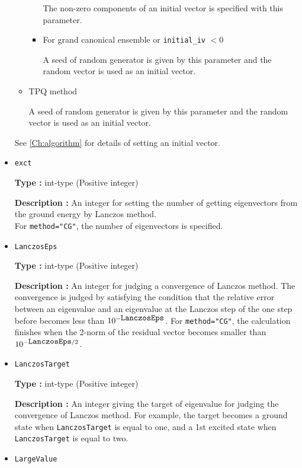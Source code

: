\begin{itemize}
\begin{itemize}
\begin{itemize}
The non-zero components of an initial vector is specified with this parameter. 

\item{For grand canonical ensemble or \verb|initial_iv| $< 0$}

A seed of random generator is given by this parameter and the random vector is used as an initial vector.
\end{itemize}

\item{TPQ method}

A seed of random generator is given by this parameter and the random vector is used as an initial vector.
\end{itemize}
See \ref{Ch:algorithm} for details of setting an initial vector.

 \item  \verb|exct|

{\bf Type :} int-type (Positive integer)

{\bf Description :} 
 An integer for setting the number of getting eigenvectors from the ground energy by Lanczos method.\\
For \verb|method="CG"|, the number of eigenvectors is specified.

\item   \verb|LanczosEps|
   
{\bf Type :} int-type (Positive integer)

{\bf Description :} An integer for judging a convergence of Lanczos method. The convergence is judged by satisfying the condition that the relative error between an eigenvalue and an eigenvalue at the Lanczos step of the one step before becomes less than $10^{- \verb|LanczosEps|}$.
For \verb|method="CG"|, the calculation finishes when the 2-norm of the residual vector
becomes smaller than $10^{- \verb|LanczosEps|/2}$.

 \item  \verb|LanczosTarget| 
   
 {\bf Type :} int-type (Positive integer)

  {\bf Description :} An integer giving the target of eigenvalue for judging the convergence of Lanczos method. For example, the target becomes a ground state when \verb|LanczosTarget|  is equal to one, and a 1st excited state when  \verb|LanczosTarget|  is equal to two.
     
\item \verb|LargeValue|


\end{itemize}
